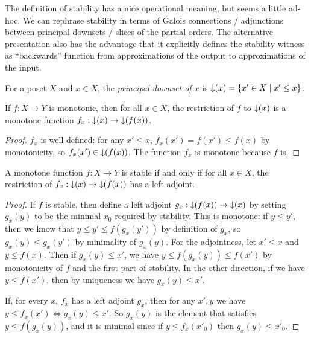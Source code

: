 The definition of stability has a nice operational meaning, but seems
a little ad-hoc. We can rephrase stability in terms of Galois
connections / adjunctions between principal downsets / slices of the
partial orders. The alternative presentation also has the advantage
that it explicitly defines the stability witness as ``backwards''
function from approximations of the output to approximations of the
input.


\begin{definition}
  For a poset $X$ and $x \in X$, the \emph{principal
    downset of $x$} is $\mathop{\downarrow}(x) = \{ x' \in X \mid x' \leq x \}$.
\end{definition}

\begin{lemma}
  If $f : X \to Y$ is monotonic, then for all $x \in X$, the
  restriction of $f$ to $\mathop{\downarrow}(x)$ is a monotone function
  $f_x : \mathop{\downarrow}(x) \to \mathop{\downarrow}(f(x))$.
\end{lemma}

\begin{proof}
  $f_x$ is well defined: for any $x' \leq x$,
  $f_x(x') = f(x') \leq f(x)$ by monotonicity, so
  $f_x(x') \in \mathop{\downarrow}(f(x))$. The function $f_x$ is monotone because
  $f$ is.
\end{proof}

\begin{lemma}
  A monotone function $f : X \to Y$ is stable if and only if for all
  $x \in X$, the restriction of $f_x : \mathop{\downarrow}(x) \to \mathop{\downarrow}(f(x))$
  has a left adjoint.
\end{lemma}

\begin{proof}
  If $f$ is stable, then define a left adjoint
  $g_x : \mathop{\downarrow}(f(x)) \to \mathop{\downarrow}(x)$ by setting $g_x(y)$ to be the
  minimal $x_0$ required by stability. This is monotone: if
  $y \leq y'$, then we know that $y \leq y' \leq f(g_x(y'))$ by
  definition of $g_x$, so $g_x(y) \leq g_x(y')$ by minimality of
  $g_x(y)$. For the adjointness, let $x' \leq x$ and $y \leq
  f(x)$. Then if $g_x(y) \leq x'$, we have
  $y \leq f(g_x(y)) \leq f(x')$ by monotonicity of $f$ and the first
  part of stability. In the other direction, if we have
  $y \leq f(x')$, then by uniqueness we have $g_x(y) \leq x'$.

  If, for every $x$, $f_x$ has a left adjoint $g_x$, then for any
  $x', y$ we have $y \leq f_x(x') \Leftrightarrow g_x(y) \leq x'$. So
  $g_x(y)$ is the element that satisfies $y \leq f(g_x(y))$, and it is
  minimal since if $y \leq f_x(x'_0)$ then $g_x(y) \leq x'_0$.
\end{proof}

